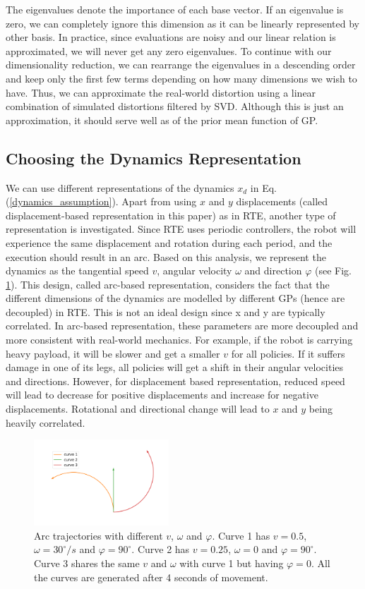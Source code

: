 \documentclass[journal]{IEEEtran}
\begin{document}
The eigenvalues denote the importance of each base vector.
If an eigenvalue is zero, we can completely ignore this dimension as it can be linearly represented by other basis.
In practice, since evaluations are noisy and our linear relation is approximated, we will never get any zero eigenvalues. 
To continue with our dimensionality reduction, we can rearrange the eigenvalues in a descending order and keep only the first few terms depending on how many dimensions we wish to have.
Thus, we can approximate the real-world distortion using a linear combination of simulated distortions filtered by SVD.
Although this is just an approximation, it should serve well as of the prior mean function of GP.

\subsection{Choosing the Dynamics Representation}
We can use different representations of the dynamics $x_d$ in Eq. (\ref{dynamics_assumption}).
Apart from using $x$ and $y$ displacements (called displacement-based representation in this paper) as in RTE, another type of representation is investigated.
Since RTE uses periodic controllers, the robot will experience the same displacement and rotation during each period, and the execution should result in an arc.
Based on this analysis, we represent the dynamics as the tangential speed $v$, angular velocity $\omega$ and direction $\varphi$ (see Fig. \ref{arcs}). 
This design, called arc-based representation, considers the fact that the different dimensions of the dynamics are modelled by different GPs (hence are decoupled) in RTE.
This is not an ideal design since x and y are typically correlated.
In arc-based representation, these parameters are more decoupled and more consistent with real-world mechanics. 
For example, if the robot is carrying heavy payload, it will be slower and get a smaller $v$ for all policies. 
If it suffers damage in one of its legs, all policies will get a shift in their angular velocities and directions.
However, for displacement based representation, reduced speed will lead to decrease for positive displacements and increase for negative displacements. Rotational and directional change will lead to $x$ and $y$ being heavily correlated.
\begin{figure}[h]
\centering
\includegraphics[width=0.45\textwidth]{example_curves.pdf}
\caption{Arc trajectories with different $v$, $\omega$ and $\varphi$. Curve 1 has $v=0.5$, $\omega = 30^\circ/s$ and $\varphi = 90^\circ$. Curve 2 has $v=0.25$, $\omega = 0$ and $\varphi = 90^\circ$.
Curve 3 shares the same $v$ and $\omega$ with curve 1 but having $\varphi = 0$.
All the curves are generated after 4 seconds of movement.
}
\label{arcs}
\end{figure}
\end{document}
